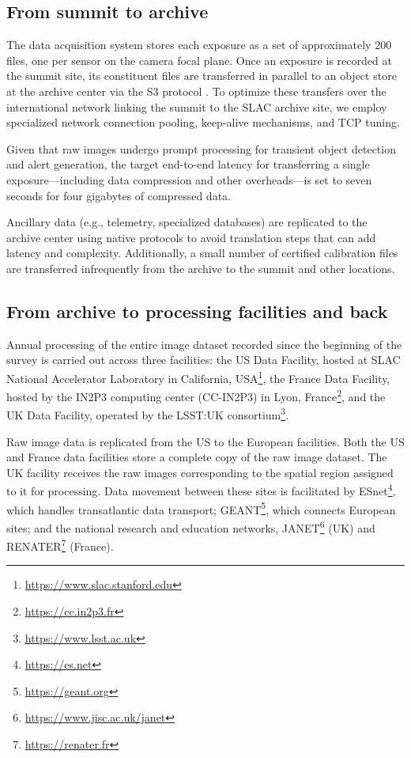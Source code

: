 \documentclass{webofc}
\begin{document}
\subsection{From summit to archive}
\label{summit-to-archive}

The data acquisition system stores each exposure as a set of approximately 200 files, one per sensor on the camera focal plane. Once an exposure is recorded at the summit site, its constituent files are transferred in parallel to an object store at the archive center via the S3 protocol \cite{s3}. To optimize these transfers over the international network linking the summit to the SLAC archive site, we employ specialized network connection pooling, keep-alive mechanisms, and TCP tuning.

Given that raw images undergo prompt processing for transient object detection and alert generation, the target end-to-end latency for transferring a single exposure—including data compression and other overheads—is set to seven seconds for four gigabytes of compressed data.

Ancillary data (e.g., telemetry, specialized databases) are replicated to the archive center using native protocols to avoid translation steps that can add latency and complexity. Additionally, a small number of certified calibration files are transferred infrequently from the archive to the summit and other locations.

\subsection{From archive to processing facilities and back}
\label{summit-to-data-facilities}

Annual processing of the entire image dataset recorded since the beginning of the survey is carried out across three facilities: the US Data Facility, hosted at SLAC National Accelerator Laboratory in California, USA\footnote{\url{https://www.slac.stanford.edu}}, the France Data Facility, hosted by the IN2P3 computing center (CC-IN2P3) in Lyon, France\footnote{\url{https://cc.in2p3.fr}}, and the UK Data Facility, operated by the LSST:UK consortium\footnote{\url{https://www.lsst.ac.uk}}.

Raw image data is replicated from the US to the European facilities. Both the US and France data facilities store a complete copy of the raw image dataset. The UK facility receives the raw images corresponding to the spatial region assigned to it for processing. Data movement between these sites is facilitated by ESnet\footnote{\url{https://es.net}}, which handles transatlantic data transport; GEANT\footnote{\url{https://geant.org}}, which connects European sites; and the national research and education networks, JANET\footnote{\url{https://www.jisc.ac.uk/janet}} (UK) and RENATER\footnote{\url{https://renater.fr}} (France).
\end{document}
